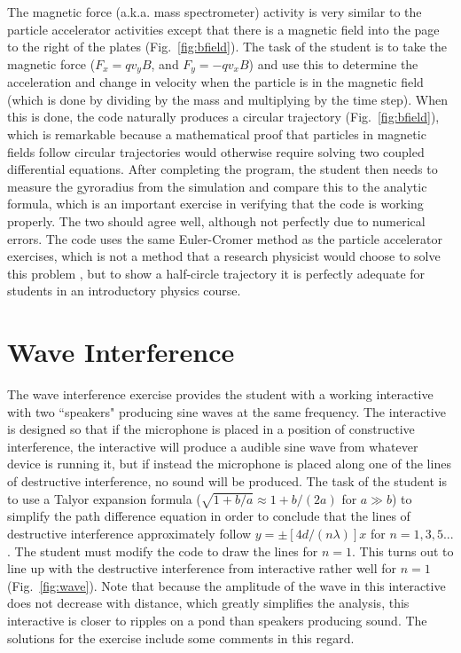 \documentclass[aps,prd,10pt,twocolumn,showpacs,preprintnumbers,amsmath,amssymb,nofootinbib,floatfix]{revtex4-1}
\begin{document}
The magnetic force (a.k.a. mass spectrometer) activity is very similar to the particle accelerator activities except that there is a magnetic field into the page to the right of the plates (Fig.~\ref{fig:bfield}). The task of the student is to take the magnetic force ($F_x = q v_y B$, and $F_y = -q v_x B$) and use this to determine the acceleration and change in velocity when the particle is in the magnetic field (which is done by dividing by the mass and multiplying by the time step). When this is done, the code naturally produces a circular trajectory (Fig.~\ref{fig:bfield}), which is remarkable because a mathematical proof that particles in magnetic fields follow circular trajectories would otherwise require solving two coupled differential equations. After completing the program, the student then needs to measure the gyroradius from the simulation and compare this to the analytic formula, which is an important exercise in verifying that the code is working properly. The two should agree well, although not perfectly due to numerical errors. The code uses the same Euler-Cromer \cite{Cromer1981} method as the particle accelerator exercises, which is not a method that a research physicist would choose to solve this problem \cite{BirdsallLangdon2004}, but to show a half-circle trajectory it is perfectly adequate for students in an introductory physics course. 

\section{Wave Interference}

The wave interference exercise provides the student with a working interactive with two ``speakers" producing sine waves at the same frequency. The interactive is designed so that if the microphone is placed in a position of constructive interference, the interactive will produce a audible sine wave from whatever device is running it, but if instead the microphone is placed along one of the lines of destructive interference, no sound will be produced. The task of the student is to use a Talyor expansion formula ($\sqrt{1 + b/a} \approx  1 + b/(2a)$ for $a \gg b$) to simplify the path difference equation in order to conclude that the lines of destructive interference approximately follow $y = \pm [4 d / (n \lambda)]x$ for $n = 1, 3, 5...$. The student must modify the code to draw the lines for $n = 1$. This turns out to line up with the destructive interference from interactive rather well for $n = 1$ (Fig.~\ref{fig:wave}). 
Note that because the amplitude of the wave in this interactive does not decrease with distance, which greatly simplifies the analysis, this interactive is closer to ripples on a pond than speakers producing sound. The solutions for the exercise include some comments in this regard.
\end{document}
